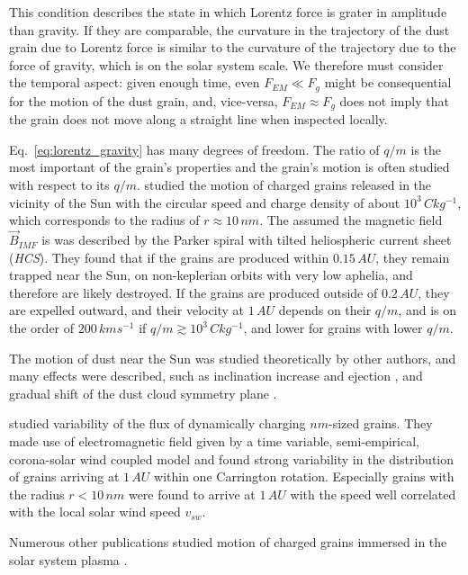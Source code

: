 This condition describes the state in which Lorentz force is grater in amplitude than gravity. If they are comparable, the curvature in the trajectory of the dust grain due to Lorentz force is similar to the curvature of the trajectory due to the force of gravity, which is on the solar system scale. We therefore must consider the temporal aspect: given enough time, even $F_{EM} \ll F_g$ might be consequential for the motion of the dust grain, and, vice-versa, $F_{EM} \approx F_g$ does not imply that the grain does not move along a straight line when inspected locally. 

Eq.~\ref{eq:lorentz_gravity} has many degrees of freedom. The ratio of $q/m$ is the most important of the grain's properties and the grain's motion is often studied with respect to its $q/m$. \citet{czechowski2010formation} studied the motion of charged grains released in the vicinity of the Sun with the circular speed and charge density of about $10^3 \, \si{C kg^{-1}}$, which corresponds to the radius of $r \approx 10 \, \si{nm}$. The assumed the magnetic field $\vec{B}_{IMF}$ is was described by the Parker spiral \citep{parker1958dynamics} with tilted heliospheric current sheet (\textit{HCS}). They found that if the grains are produced within $0.15 \, \si{AU}$, they remain trapped near the Sun, on non-keplerian orbits with very low aphelia, and therefore are likely destroyed. If the grains are produced outside of $0.2 \, \si{AU}$, they are expelled outward, and their velocity at $1 \, \si{AU}$ depends on their $q/m$, and is on the order of $200 \, \si{km s^{-1}}$ if $q/m \gtrsim 10^3 \, \si{C kg^{-1}}$, and lower for grains with lower $q/m$. 

The motion of dust near the Sun was studied theoretically by other authors, and many effects were described, such as inclination increase and ejection \citep{krivov1998dynamics}, and gradual shift of the dust cloud symmetry plane \citep{morfill1979motion}.

\citet{poppe2020effects} studied variability of the flux of dynamically charging $\si{nm}$-sized grains. They made use of electromagnetic field given by a time variable, semi-empirical, corona-solar wind coupled model and found strong variability in the distribution of grains arriving at $1 \, \si{AU}$ within one Carrington rotation. Especially grains with the radius $r<10 \, \si{nm}$ were found to arrive at $1 \, \si{AU}$ with the speed well correlated with the local solar wind speed $v_{sw}$. 

Numerous other publications studied motion of charged grains immersed in the solar system plasma \citep{mann2007nanoparticles,horanyi1996charged,juhasz2013dynamics,stamm2019dust,czechowski2021dynamics,poppe2022effects,rusk1988effect}.

